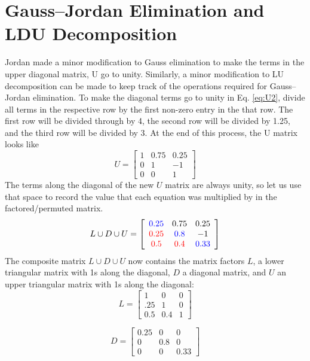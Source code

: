 \documentclass[12pt]{article}   %
\begin{document}
\section{Gauss--Jordan Elimination and LDU Decomposition}
Jordan made a minor modification to Gauss elimination to make the terms in the upper diagonal matrix, U go to unity. Similarly, a minor modification to LU decomposition can be made to keep track of the operations required for Gauss--Jordan elimination. To make the diagonal terms go to unity in Eq. \ref{eq:U2}, divide all terms in the respective row by the first non-zero entry in the that row. The first row will be divided through by 4, the second row will be divided by 1.25, and the third row will be divided by 3. At the end of this process, the U matrix looks like
\begin{equation}
U=\left[
\begin{array}{ccc}
1 & 0.75 & 0.25 \\
0 & 1 & -1\\
0 & 0 & 1
\end{array}
\right]
\label{eq:U2}
\end{equation}
The terms along the diagonal of the new $U$ matrix are always unity, so let us use that space to record the value that each equation was multiplied by in the factored/permuted matrix.
\begin{equation}
L\cup D\cup U=\left[
\begin{array}{ccc}
{\color{blue}0.25} & 0.75 & 0.25 \\
{\color{red}0.25} & {\color{blue}0.8} & -1\\
{\color{red}0.5} & {\color{red}0.4} & {\color{blue}0.33}
\end{array}
\right]
\label{eq:U2}
\end{equation}
The composite matrix $L \cup D \cup U$ now contains the matrix factors $L$, a lower triangular matrix with 1s along the diagonal, $D$ a diagonal matrix, and $U$ an upper triangular matrix with 1s along the diagonal:
\begin{equation}
L=\begin{bmatrix}
1 & 0 & 0 \\
.25 & 1 & 0 \\
0.5 & 0.4 & 1
\end{bmatrix}
\end{equation}

\begin{equation}
D=\left[
\begin{array}{ccc}
0.25 & 0 & 0\\
0 & 0.8 & 0\\
0 & 0 & 0.33
\end{array}
\right]
\end{equation}
\end{document}
